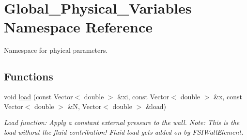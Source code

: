 \hypertarget{namespaceGlobal__Physical__Variables}{}\section{Global\+\_\+\+Physical\+\_\+\+Variables Namespace Reference}
\label{namespaceGlobal__Physical__Variables}


Namespace for phyical parameters.  


\subsection*{Functions}
\begin{DoxyCompactItemize}
\item 
void \hyperlink{namespaceGlobal__Physical__Variables_a321267e1efb30b5d586302509354fb07}{load} (const Vector$<$ double $>$ \&xi, const Vector$<$ double $>$ \&x, const Vector$<$ double $>$ \&N, Vector$<$ double $>$ \&load)
\begin{DoxyCompactList}\small\item\em Load function\+: Apply a constant external pressure to the wall. Note\+: This is the load without the fluid contribution! Fluid load gets added on by F\+S\+I\+Wall\+Element. \end{DoxyCompactList}\end{DoxyCompactItemize}
